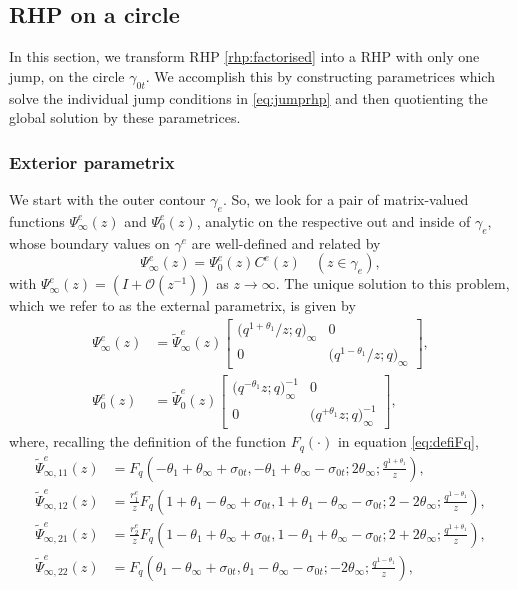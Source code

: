 \documentclass[a4paper,reqno,11pt]{amsart}
\numberwithin{equation}{section}
\numberwithin{figure}{section}
\theoremstyle{plain}
\theoremstyle{remark}
\newcounter{rhp}
\numberwithin{rhp}{section}
\begin{document}
\subsection{RHP on a circle}\label{sec:rhpcircle}
In this section, we transform RHP \ref{rhp:factorised} into a RHP with only one jump, on the circle $\gamma_{0t}$. We accomplish this by constructing parametrices which solve the individual jump conditions in \eqref{eq:jumprhp} and then quotienting the global solution by these parametrices.


\subsubsection{Exterior parametrix}\label{subsub:exterior-param}
We start with the outer contour $\gamma_e$. So, we look for a pair of matrix-valued functions $\Psi_\infty^e(z)$ and $\Psi_0^e(z)$, analytic on the respective out and inside of $\gamma_e$, whose boundary values on $\gamma^e$ are well-defined and related by
\begin{equation*}
   \Psi_\infty^e(z)= \Psi_0^e(z)C^e(z)\quad (z\in \gamma_e),
\end{equation*}
with $\Psi_\infty^e(z)=(I+\mathcal{O}(z^{-1}))$ as $z\rightarrow \infty$.
 The unique solution to this problem, which we refer to as the external parametrix, is given by
\begin{align}
    \Psi_\infty^e(z)&=\widetilde{\Psi}_\infty^e(z) \begin{bmatrix} \big(q^{1+\theta_1}/z;q\big)_\infty & 0\\
    0 & \big(q^{1-\theta_1}/z;q\big)_\infty
    \end{bmatrix},\\    \Psi_0^e(z)&=\widetilde{\Psi}_0^e(z)\begin{bmatrix} \big(q^{-\theta_1}z;q\big)_\infty^{-1} & 0\\
    0 & \big(q^{+\theta_1}z;q\big)_\infty^{-1} 
    \end{bmatrix},\label{explicit:psi0e}
\end{align}
where, recalling the definition of the function $F_q(\cdot)$ in equation \eqref{eq:defiFq},
\begin{equation}\label{eq:psiinfedefi}
\begin{aligned}
\widetilde{\Psi}_{\infty,{11}}^e(z)&=F_q\left(-\theta_1+\theta_\infty+\sigma_{0t},-\theta_1+\theta_\infty-\sigma_{0t};2 \theta_\infty;
\frac{q^{1+\theta_1}}{z}\right),\\
\widetilde{\Psi}_{\infty,{12}}^e(z)&=\frac{r_1^e}{z}F_q\left(1+\theta_1-\theta_\infty+\sigma_{0t},1+\theta_1-\theta_\infty-\sigma_{0t};2-2\theta_\infty;
\frac{q^{1-\theta_1}}{z}\right),\\
\widetilde{\Psi}_{\infty,{21}}^e(z)&=\frac{r_2^e}{z}F_q\left(1-\theta_1+\theta_\infty+\sigma_{0t},1-\theta_1+\theta_\infty-\sigma_{0t};2+2\theta_\infty;
\frac{q^{1+\theta_1}}{z}\right),\\
\widetilde{\Psi}_{\infty,{22}}^e(z)&=F_q\left(\theta_1-\theta_\infty+\sigma_{0t},\theta_1-\theta_\infty-\sigma_{0t};-2\theta_\infty;
\frac{q^{1-\theta_1}}{z}\right),
\end{aligned}
\end{equation}
\end{document}
